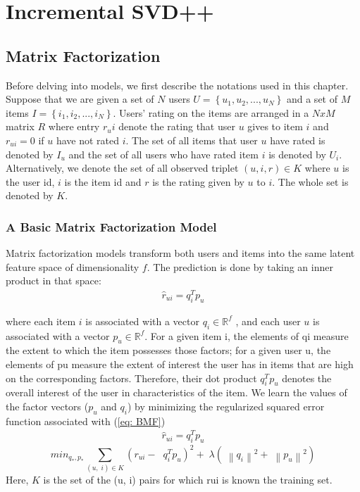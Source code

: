 \documentclass[oneside,13pt]{extreport}
\begin{document}
\chapter{Incremental SVD++}
\label{ISVD++_chapter}

\section{Matrix Factorization}
Before delving into models, we first describe the notations used in this chapter. Suppose that we are given a set of $N$ users $U = \left\{ {{u_1},{u_2},...,{u_N}} \right\}$ and a set of $M$ items $I = \left\{ {{i_1},{i_2},...,{i_N}} \right\}$. Users’ rating on the items are arranged in a $NxM$ matrix $R$ where entry $r_ui$ denote the rating that user $u$ gives to item $i$ and $r_{ui} = 0$ if $u$ have not rated $i$. The set of all items that user $u$
have rated is denoted by $I_u$ and the set of all users who have rated item $i$ is denoted by $U_i$. Alternatively, we denote the set of all observed
triplet $\left( {u,i,r} \right) \in K$  where $u$ is the user id, $i$ is the item id
and $r$ is the rating given by $u$ to $i$. The whole set is denoted by $K$.

\subsection{A Basic Matrix Factorization Model}
Matrix factorization models transform both users and items into the same latent feature space of dimensionality $f$. The prediction is done by taking an inner product in that space: 
\begin{eqnarray}
\label{eq:BMF}
{\hat r_{ui}} = q_i^T{p_u} 
\end{eqnarray}

where each item $i$ is associated with a vector ${q_i} \in {\mathbb{R}^f}$ , and each user $u$ is associated with a vector ${p_u} \in {\mathbb{R}^f}$. For a given item i, the elements of qi
measure the extent to which the item possesses those factors; for a given user u, the elements of pu measure the extent of interest the user has in items that are high on the corresponding factors. Therefore, their dot product $q_i^T{p_u}$ denotes the overall interest of the user in characteristics of the item.
We learn the values of the factor vectors (${p_u}$ and ${q_i}$) by minimizing the regularized squared error function associated with (\ref{eq: BMF})
\begin{eqnarray}
\label{eq:BMF}
{\hat r_{ui}} = q_i^T{p_u} 
\end{eqnarray}
\begin{equation}
mi{n_{{q_*},{p_*}}}\mathop \sum \limits_{\left( {u,\;i} \right) \in K} {\left( {{r_{ui}} - \;\;q_i^T{p_u}} \right)^2} + \;\lambda \left( {\;{{\left\| {{q_i}} \right\|}^2} + \;{{\left\| {{p_u}} \right\|}^2}} \right)
\label{eq: MBMF}
\end{equation}
Here, $K$ is the set of the (u, i) pairs for which rui is known the training set. 
\end{document}
